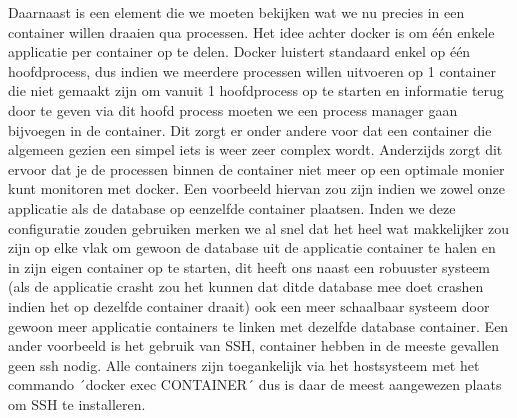 Daarnaast is een element die we moeten bekijken wat we nu precies in een container willen draaien qua processen. Het idee achter docker is om één enkele applicatie per container op te delen. Docker luistert standaard enkel op één hoofdprocess, dus indien we meerdere processen willen uitvoeren op 1 container die niet gemaakt zijn om vanuit 1 hoofdprocess op te starten en informatie terug door te geven via dit hoofd process moeten we een process manager gaan bijvoegen in de container. Dit zorgt er onder andere voor dat een container die algemeen gezien een simpel iets is weer zeer complex wordt. Anderzijds zorgt dit ervoor dat je de processen binnen de container niet meer op een optimale monier kunt monitoren met docker. Een voorbeeld hiervan zou zijn indien we zowel onze applicatie als de database op eenzelfde container plaatsen. Inden we deze configuratie zouden gebruiken merken we al snel dat het heel wat makkelijker zou zijn op elke vlak om gewoon de database uit de applicatie container te halen en in zijn eigen container op te starten, dit heeft ons naast een robuuster systeem (als de applicatie crasht zou het kunnen dat ditde database mee doet crashen indien het op dezelfde container draait) ook een meer schaalbaar systeem door gewoon meer applicatie containers te linken met dezelfde database container. Een ander voorbeeld is het gebruik van SSH, container hebben in de meeste gevallen geen ssh nodig. Alle containers zijn toegankelijk via het hostsysteem met het commando ´docker exec CONTAINER´ dus is daar de meest aangewezen plaats om SSH te installeren.
